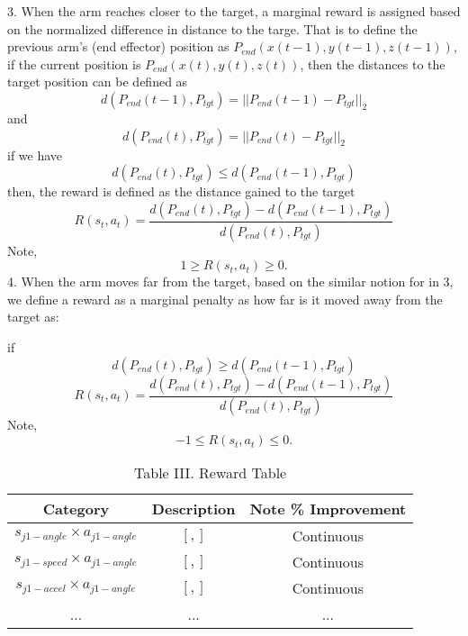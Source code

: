 \documentclass[conference]{IEEEtran}
\begin{document}
3. When the arm reaches closer to the target, a
marginal reward is assigned based on the normalized  
difference in distance to the targe. That is to define
the previous arm's (end effector) position as 
$P_{end}(x(t-1),y(t-1),z(t-1))$, if the current position
is $P_{end}(x(t),y(t),z(t))$, then the distances to the 
target position can be defined as 
\begin{equation}
d(P_{end}(t-1),P_{tgt}) = || P_{end}(t-1) - P_{tgt}  ||_2 
\end{equation} 
and 
\begin{equation}
d(P_{end}(t),P_{tgt}) = || P_{end}(t) - P_{tgt}  ||_2 
\end{equation}
if we have 
\begin{equation}
d(P_{end}(t),P_{tgt}) \leq d(P_{end}(t-1),P_{tgt}) 
\end{equation}
then, the reward is defined as the distance gained to the 
target 
\begin{equation}
R(s_t,a_t) = \frac{ d(P_{end}(t),P_{tgt}) - d(P_{end}(t-1),P_{tgt})}
{ d(P_{end}(t),P_{tgt}) }  
\end{equation}
Note, 
\begin{equation}
1 \geq R(s_t,a_t) \geq 0. 
\end{equation}
4. When the arm moves far from the target, based on the similar
notion for in 3, we define a reward as a marginal penalty
as how far is it moved away from the target as: 

if
\begin{equation}
d(P_{end}(t),P_{tgt}) \geq d(P_{end}(t-1),P_{tgt}) 
\end{equation}
\begin{equation}
R(s_t,a_t) = \frac{ d(P_{end}(t),P_{tgt}) - d(P_{end}(t-1),P_{tgt})}
{ d(P_{end}(t),P_{tgt}) }
\end{equation}
Note, 
\begin{equation}
-1 \leq R(s_t,a_t) \leq 0. 
\end{equation}
\begin{table}[H] %
\renewcommand{\arraystretch}{1.3} 
\caption{Table III. Reward Table}
\label{state-Table1}
\centering 
\begin{tabular}{|c||c||c|}
\hline
Category     & Description    & Note    \% Improvement \\
\hline
$s_{j1-angle} \times a_{j1-angle}$     & $[,]$ & Continuous \\
\hline
$s_{j1-speed} \times a_{j1-angle}$    & $[,]$ & Continuous \\
\hline 
$s_{j1-accel} \times a_{j1-angle}$     & $[,]$ & Continuous \\
\hline 
...     & ... & ... \\
\hline 
\end{tabular}
\end{table}
\end{document}
